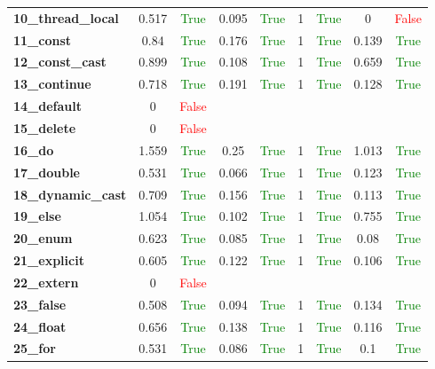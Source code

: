 \documentclass{article}
\begin{document}
\begin{xltabular}{\textwidth}{lcccccccc}
\textbf{10\_thread\_local}& 0.517&\textcolor{green}{True}& 0.095&\textcolor{green}{True}& 1&\textcolor{green}{True}& 0&\textcolor{red}{False} \\[0.5ex]
\textbf{11\_const}& 0.84&\textcolor{green}{True}& 0.176&\textcolor{green}{True}& 1&\textcolor{green}{True}& 0.139&\textcolor{green}{True} \\[0.5ex]
\textbf{12\_const\_cast}& 0.899&\textcolor{green}{True}& 0.108&\textcolor{green}{True}& 1&\textcolor{green}{True}& 0.659&\textcolor{green}{True} \\[0.5ex]
\textbf{13\_continue}& 0.718&\textcolor{green}{True}& 0.191&\textcolor{green}{True}& 1&\textcolor{green}{True}& 0.128&\textcolor{green}{True} \\[0.5ex]
\textbf{14\_default}& 0&\textcolor{red}{False} \\[0.5ex]
\textbf{15\_delete}& 0&\textcolor{red}{False} \\[0.5ex]
\textbf{16\_do}& 1.559&\textcolor{green}{True}& 0.25&\textcolor{green}{True}& 1&\textcolor{green}{True}& 1.013&\textcolor{green}{True} \\[0.5ex]
\textbf{17\_double}& 0.531&\textcolor{green}{True}& 0.066&\textcolor{green}{True}& 1&\textcolor{green}{True}& 0.123&\textcolor{green}{True} \\[0.5ex]
\textbf{18\_dynamic\_cast}& 0.709&\textcolor{green}{True}& 0.156&\textcolor{green}{True}& 1&\textcolor{green}{True}& 0.113&\textcolor{green}{True} \\[0.5ex]
\textbf{19\_else}& 1.054&\textcolor{green}{True}& 0.102&\textcolor{green}{True}& 1&\textcolor{green}{True}& 0.755&\textcolor{green}{True} \\[0.5ex]
\textbf{20\_enum}& 0.623&\textcolor{green}{True}& 0.085&\textcolor{green}{True}& 1&\textcolor{green}{True}& 0.08&\textcolor{green}{True} \\[0.5ex]
\textbf{21\_explicit}& 0.605&\textcolor{green}{True}& 0.122&\textcolor{green}{True}& 1&\textcolor{green}{True}& 0.106&\textcolor{green}{True} \\[0.5ex]
\textbf{22\_extern}& 0&\textcolor{red}{False} \\[0.5ex]
\textbf{23\_false}& 0.508&\textcolor{green}{True}& 0.094&\textcolor{green}{True}& 1&\textcolor{green}{True}& 0.134&\textcolor{green}{True} \\[0.5ex]
\textbf{24\_float}& 0.656&\textcolor{green}{True}& 0.138&\textcolor{green}{True}& 1&\textcolor{green}{True}& 0.116&\textcolor{green}{True} \\[0.5ex]
\textbf{25\_for}& 0.531&\textcolor{green}{True}& 0.086&\textcolor{green}{True}& 1&\textcolor{green}{True}& 0.1&\textcolor{green}{True} \\[0.5ex]

\end{xltabular}
\end{document}
